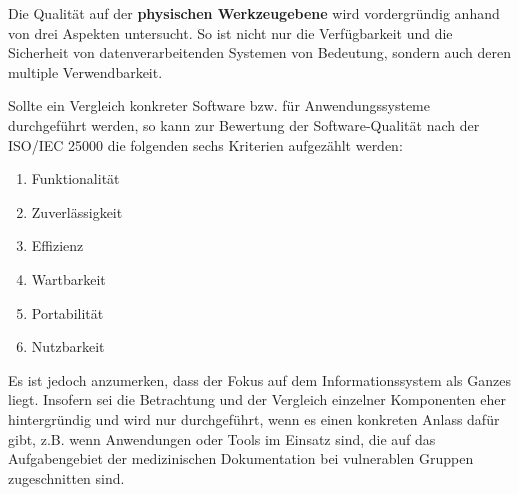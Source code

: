 Die Qualität auf der \textbf{physischen Werkzeugebene} wird vordergründig anhand von drei Aspekten untersucht. So ist nicht nur die Verfügbarkeit und die Sicherheit von datenverarbeitenden Systemen von Bedeutung, sondern auch deren multiple Verwendbarkeit.

Sollte ein Vergleich konkreter Software bzw. für Anwendungssysteme durchgeführt werden, so kann zur Bewertung der Software-Qualität nach der ISO/IEC 25000 die folgenden sechs Kriterien aufgezählt werden:

\begin{enumerate}
	\item Funktionalität
	\item Zuverlässigkeit
	\item Effizienz
	\item Wartbarkeit
	\item Portabilität
	\item Nutzbarkeit
\end{enumerate}

Es ist jedoch anzumerken, dass der Fokus auf dem Informationssystem als Ganzes liegt. Insofern sei die Betrachtung und der Vergleich einzelner Komponenten eher hintergründig und wird nur durchgeführt, wenn es einen konkreten Anlass dafür gibt, z.B. wenn Anwendungen oder Tools im Einsatz sind, die auf das Aufgabengebiet der medizinischen Dokumentation bei vulnerablen Gruppen zugeschnitten sind.

